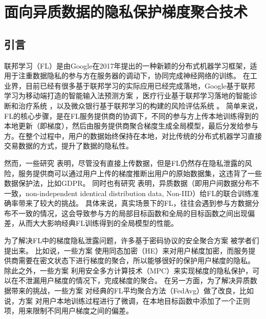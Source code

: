 \chapter{面向异质数据的隐私保护梯度聚合技术}

\section{引言}
联邦学习\cite{mcmahan2017communication}（FL）是由Google在2017年提出的一种新颖的分布式机器学习框架，适用于注重数据隐私的参与方在服务器的调动下，协同完成神经网络的训练。
在工业界，目前已经有很多基于联邦学习的实际应用已经完成落地，Google基于联邦学习为移动端打造的智能输入法预测方案 \cite{hard2018federated}，医疗行业基于联邦学习落地的智能诊断和治疗系统 \cite{li2020deepfed}，以及微众银行基于联邦学习的构建的风险评估系统 \cite{DBLP:conf/ndss/CaoF0G21}。 
简单来说，FL的核心步骤，是在FL服务提供商的协调下，不同的参与方上传本地训练得到的本地更新（即梯度），然后由服务提供商聚合梯度生成全局模型，最后分发给参与方。在整个过程中，用户的数据始终保持在本地，对比传统的分布式机器学习直接交易数据的方式，提升了数据的隐私性。

然而，一些研究 \cite{geiping2020inverting,zhu2019deep,gao2021privacy} 表明，尽管没有直接上传数据，但是FL仍然存在隐私泄露的风险，服务提供商可以通过用户上传的梯度推断出用户的原始数据集，这违背了一些数据保护法，比如GDPR。
同时也有研究 \cite{zhao2018federated, tuor2021overcoming, yoshida2019hybrid}表明，异质数据（即用户间数据分布不一致，non-independent identical distribution data, Non-IID）给FL的联合训练准确率带来了较大的挑战。
具体来说，真实场景下的FL，往往会遇到参与方数据分布不一致的情况，这会导致参与方的局部目标函数和全局的目标函数之间出现偏差，从而大大影响经典FL训练得到的全局模型的性能。


为了解决FL中的梯度隐私泄露问题，许多基于密码协议的安全聚合方案 \cite{liu2021privacy, aono2017privacy, zhang2020batchcrypt, dong2021flod, hao2021efficient} 被学者们提出来。
比如说，一些方案 \cite{liu2021privacy, aono2017privacy, zhang2020batchcrypt} 使用同态加密（HE）来对用户梯度加密，而服务提供商需要在密文状态下进行梯度的聚合，所以能够很好的保护用户梯度的隐私。
除此之外，一些方案 \cite{hao2021efficient, dong2021flod} 利用安全多方计算技术（MPC）来实现梯度的隐私保护，可以在不泄漏用户梯度的情况下，完成梯度的聚合。
在另一方面，为了解决异质数据带来的挑战，一些方案 \cite{li2020federated, gao2022feddc, ghosh2020efficient, briggs2020federated}对经典的FL平均聚合方法（FedAvg\cite{mcmahan2017communication}）做了改良，比如说，方案 \cite{li2020federated} 对用户本地训练过程进行了微调，在本地目标函数中添加了一个正则项，用来限制不同用户梯度之间的偏差。

